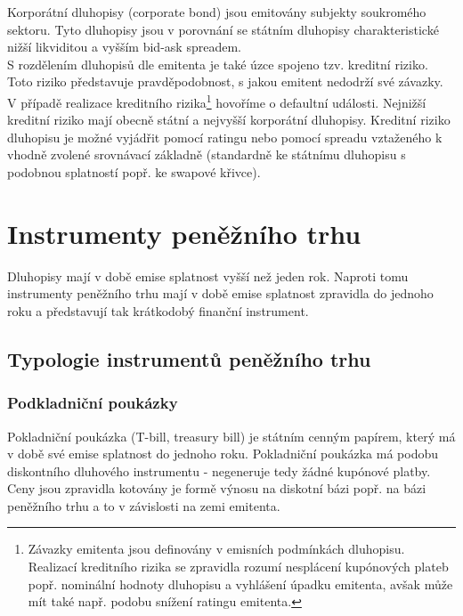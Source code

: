 \documentclass[a4paper]{book}
\begin{document}
Korporátní dluhopisy (corporate bond) jsou emitovány subjekty soukromého sektoru. Tyto dluhopisy jsou v porovnání se státním dluhopisy charakteristické nižší likviditou a vyšším bid-ask spreadem.\\

S rozdělením dluhopisů dle emitenta je také úzce spojeno tzv. kreditní riziko. Toto riziko představuje pravděpodobnost, s jakou emitent nedodrží své závazky. V případě realizace kreditního rizika\footnote{Závazky emitenta jsou definovány v emisních podmínkách dluhopisu. Realizací kreditního rizika se zpravidla rozumí nesplácení kupónových plateb popř. nominální hodnoty dluhopisu a vyhlášení úpadku emitenta, avšak může mít také např. podobu snížení ratingu emitenta.} hovoříme o defaultní události. Nejnižší kreditní riziko mají obecně státní a nejvyšší korporátní dluhopisy. Kreditní riziko dluhopisu je možné vyjádřit pomocí ratingu nebo pomocí spreadu vztaženého k vhodně zvolené srovnávací základně (standardně ke státnímu dluhopisu s podobnou splatností popř. ke swapové křivce).

\section{Instrumenty peněžního trhu}

Dluhopisy mají v době emise splatnost vyšší než jeden rok. Naproti tomu instrumenty peněžního trhu mají v době emise splatnost zpravidla do jednoho roku a představují tak krátkodobý finanční instrument.

\subsection{Typologie instrumentů peněžního trhu}

\subsubsection{Podkladniční poukázky}

Pokladniční poukázka (T-bill, treasury bill) je státním cenným papírem, který má v době své emise splatnost do jednoho roku. Pokladniční poukázka má podobu diskontního dluhového instrumentu - negeneruje tedy žádné kupónové platby. Ceny jsou zpravidla kotovány je formě výnosu na diskotní bázi popř. na bázi peněžního trhu a to v závislosti na zemi emitenta.
\end{document}
